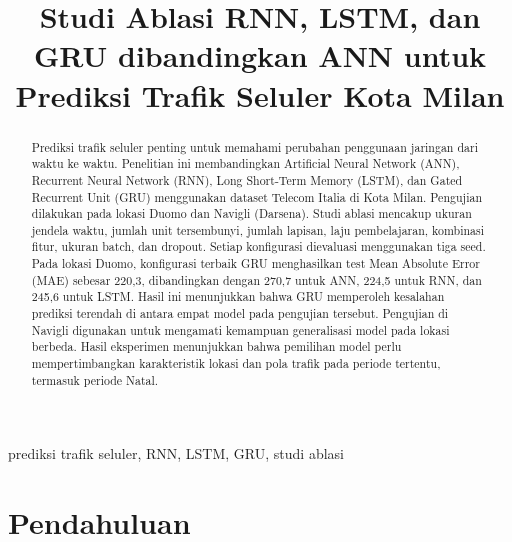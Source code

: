 \documentclass[conference,a4paper]{IEEEtran}
\begin{document}
\title{Studi Ablasi RNN, LSTM, dan GRU dibandingkan ANN untuk Prediksi Trafik Seluler Kota Milan}

\author{
\and
{}
}

\maketitle

\begin{abstract}
Prediksi trafik seluler penting untuk memahami perubahan penggunaan jaringan dari waktu ke waktu. Penelitian ini membandingkan Artificial Neural Network (ANN), Recurrent Neural Network (RNN), Long Short-Term Memory (LSTM), dan Gated Recurrent Unit (GRU) menggunakan dataset Telecom Italia di Kota Milan. Pengujian dilakukan pada lokasi Duomo dan Navigli (Darsena). Studi ablasi mencakup ukuran jendela waktu, jumlah unit tersembunyi, jumlah lapisan, laju pembelajaran, kombinasi fitur, ukuran batch, dan dropout. Setiap konfigurasi dievaluasi menggunakan tiga seed. Pada lokasi Duomo, konfigurasi terbaik GRU menghasilkan test Mean Absolute Error (MAE) sebesar 220,3, dibandingkan dengan 270,7 untuk ANN, 224,5 untuk RNN, dan 245,6 untuk LSTM. Hasil ini menunjukkan bahwa GRU memperoleh kesalahan prediksi terendah di antara empat model pada pengujian tersebut. Pengujian di Navigli digunakan untuk mengamati kemampuan generalisasi model pada lokasi berbeda. Hasil eksperimen menunjukkan bahwa pemilihan model perlu mempertimbangkan karakteristik lokasi dan pola trafik pada periode tertentu, termasuk periode Natal.
\end{abstract}

\begin{IEEEkeywords}
prediksi trafik seluler, RNN, LSTM, GRU, studi ablasi
\end{IEEEkeywords}

\section{Pendahuluan}
\end{document}

